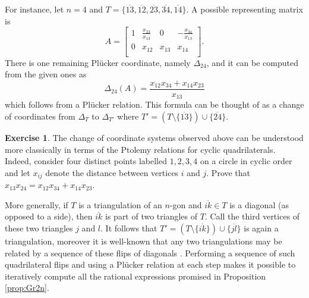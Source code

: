 \documentclass{amsart}
\theoremstyle{definition}
\newtheorem{exercise}[theorem]{Exercise}
\theoremstyle{remark}
\numberwithin{equation}{section}
\begin{document}
		For instance, let $n=4$ and $T = \{\overline{13},\overline{12},\overline{23},\overline{34},\overline{14}\}$.  A possible representing matrix is
		\begin{displaymath}
			A = \left[\begin{array}{cccc}
			1 & \frac{x_{23}}{x_{13}} & 0 & -\frac{x_{34}}{x_{13}} \\
			0 & x_{12} & x_{13} & x_{14} \\
			\end{array}\right].
		\end{displaymath}
		There is one remaining Pl\"ucker coordinate, namely $\Delta_{24}$, and it can be computed from the given ones as
		\begin{displaymath}
		\Delta_{24}(A) = \frac{x_{12}x_{34} + x_{14}x_{23}}{x_{13}}
		\end{displaymath}
		which follows from a Pl\"ucker relation.	This formula can be thought of as a change of coordinates from $\Delta_T$ to $\Delta_{T'}$ where $T' = (T \setminus \{\overline{13}\}) \cup \{\overline{24}\}$.  
    \setcounter{subexercise}{2}
    \begin{exercise}
      The change of coordinate systems observed above can be understood more classically in terms of the Ptolemy relations for cyclic quadrilaterals.  Indeed, consider four distinct points labelled $1,2,3,4$ on a circle in cyclic order and let $x_{ij}$ denote the distance between vertices $i$ and $j$.  Prove that $x_{13}x_{24}=x_{12}x_{34}+x_{14}x_{23}$.
    \end{exercise}
		
		More generally, if $T$ is a triangulation of an $n$-gon and $\overline{ik} \in T$ is a diagonal (as opposed to a side), then $\overline{ik}$ is part of two triangles of $T$.  Call the third vertices of these two triangles $j$ and $l$.  It follows that $T' = (T \setminus \{\overline{ik}\}) \cup \{\overline{jl}\}$ is again a triangulation, moreover it is well-known that any two triangulations may be related by a sequence of these flips of diagonals \cite{H91}.  Performing a sequence of such quadrilateral flips and using a Pl\"ucker relation at each step makes it possible to iteratively compute all the rational expressions promised in Proposition \ref{prop:Gr2n}.
 
\end{document}
